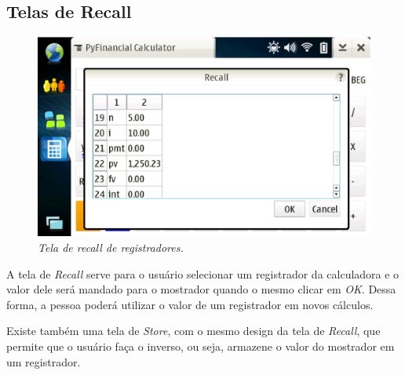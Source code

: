 \subsection{Telas de Recall}

\begin{figure}[!h]
 \includegraphics[scale=0.55]{tela_recall.eps}
 \caption{\it Tela de \textit{recall} de registradores.} \label{tab:tela_recall}
\end{figure}

A tela de \textit{Recall} serve para o usuário selecionar um registrador da calculadora e o valor dele será mandado para o mostrador quando o mesmo clicar em \textit{OK}. Dessa forma, a pessoa poderá utilizar o valor de um registrador em novos cálculos.

Existe também uma tela de \textit{Store}, com o mesmo design da tela de \textit{Recall}, que permite que o usuário faça o inverso, ou seja, armazene o valor do mostrador em um registrador.